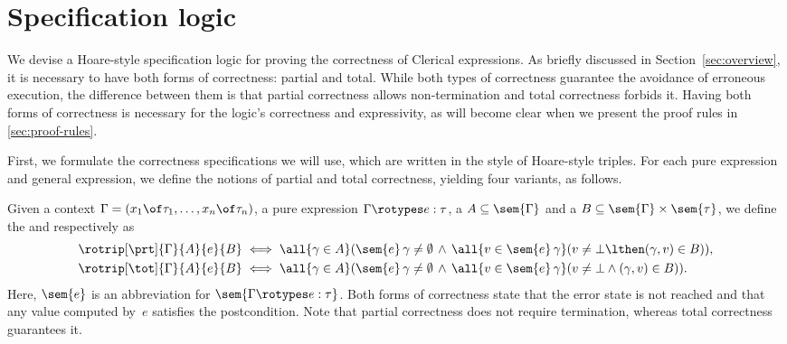 \section{Specification logic}
\label{sec:specification-logic}

We devise a Hoare-style specification logic for proving the correctness of Clerical expressions.
As briefly discussed in Section~\ref{sec:overview}, 
it is necessary to have both forms of correctness: partial and total.
While both types of correctness guarantee the avoidance of erroneous execution, the difference between them is that
partial correctness allows non-termination and total correctness forbids it. 
Having both forms of correctness is necessary  for the logic's correctness and expressivity, as will become clear when we present the proof rules in \cref{sec:proof-rules}.

First, we  formulate the correctness specifications we will use, which are written in the style of Hoare-style triples. For each pure expression and general expression, we define the notions of partial and total correctness, yielding four variants, as follows.


Given a context $\Gamma = (x_1 \of \tau_1, \ldots, x_n \of \tau_n)$, a pure expression $\Gamma \rotypes e : \tau$, a  $A \subseteq \sem{\Gamma}$ and a  $B \subseteq \sem{\Gamma} \times \sem{\tau}$, we define the  and  respectively as
%
\begin{align*}
  \rotrip[\prt] {\Gamma} {A} {e} {B}
  &\iff
  \all{\gamma \in A} 
  (\sem{e} \, \gamma \neq \emptyset 
\,\land \,
  \all{v \in \sem{e} \, \gamma}
 (v \neq \bot \lthen (\gamma, v) \in B)),
  \\
  \rotrip[\tot] {\Gamma} {A} {e} {B}
  &\iff
   \all{\gamma \in A} 
  (\sem{e} \, \gamma \neq \emptyset 
\,\land \,
  \all{v \in \sem{e} \, \gamma}
 (v \neq \bot \land(\gamma, v) \in B)).
\end{align*}
%
Here, $\sem{e}$ is an abbreviation for $\sem{\Gamma \rotypes e : \tau}$.
Both forms of correctness state that the error state is not reached and that any value computed by~$e$ satisfies the postcondition. Note that partial correctness does not require termination, whereas total correctness guarantees it.

